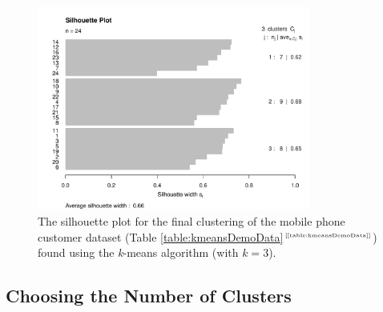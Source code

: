 \documentclass[xcolor={table}]{beamer}
\newcommand{\ourRef}[1]{\ref{#1}$^{\text{\tiny[\pageref{#1}]}}$}
\begin{document}
 \begin{frame} 
\begin{figure}[tbh]
       \begin{centering}
			\includegraphics[width=0.8\textwidth]{images/fmlpda_figure_10_7.pdf}
       \caption{The silhouette plot for the final clustering of the mobile phone customer dataset (Table \ourRef{table:kmeansDemoData}) found using the \textit{k}-means algorithm (with $k=3$).}
       \label{fig:demoSilhouette}
       \end{centering}
\end{figure}
\end{frame} 


\subsection{Choosing the Number of Clusters}
\end{document}
